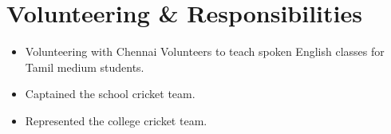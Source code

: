 \documentclass[letterpaper,10pt]{article}
\newenvironment{cvitemize}{
    \begin{itemize}[leftmargin=10pt,label={},afterlabel={},after=\vspace{-12pt}]
}{
    \end{itemize}
}
\newcommand{\point}{\raisebox{0.1\height}{$\rightarrow$}\hspace{4pt}}
\begin{document}
\section*{Volunteering \& Responsibilities}
\begin{cvitemize}
    \item \point Volunteering with Chennai Volunteers to teach spoken English classes for Tamil medium students.
    \item \point Captained the school cricket team.
    \item \point Represented the college cricket team.
\end{cvitemize}
\end{document}
